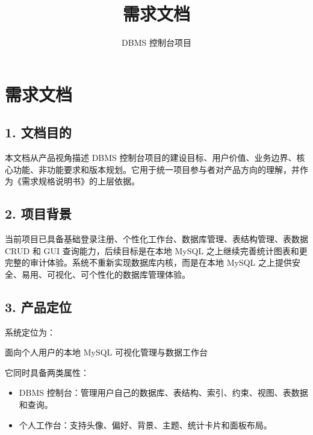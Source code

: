 \documentclass[
  a4paper,
  UTF8]{ctexart}
\title{需求文档}
\author{DBMS 控制台项目}
\date{}
\newenvironment{Shaded}{}{}
\newcommand{\NormalTok}[1]{#1}
\providecommand{\tightlist}{%
  \setlength{\itemsep}{0pt}\setlength{\parskip}{0pt}}
\begin{document}
\maketitle

\renewcommand*\contentsname{目录}
{
\hypersetup{linkcolor=}
\setcounter{tocdepth}{3}
\tableofcontents
}
\hypertarget{ux9700ux6c42ux6587ux6863}{%
\section{需求文档}\label{ux9700ux6c42ux6587ux6863}}

\hypertarget{ux6587ux6863ux76eeux7684}{%
\subsection{1. 文档目的}\label{ux6587ux6863ux76eeux7684}}

本文档从产品视角描述 DBMS
控制台项目的建设目标、用户价值、业务边界、核心功能、非功能要求和版本规划。它用于统一项目参与者对产品方向的理解，并作为《需求规格说明书》的上层依据。

\hypertarget{ux9879ux76eeux80ccux666f}{%
\subsection{2. 项目背景}\label{ux9879ux76eeux80ccux666f}}

当前项目已具备基础登录注册、个性化工作台、数据库管理、表结构管理、表数据
CRUD 和 GUI 查询能力，后续目标是在本地 MySQL
之上继续完善统计图表和更完整的审计体验。系统不重新实现数据库内核，而是在本地
MySQL 之上提供安全、易用、可视化、可个性化的数据库管理体验。

\hypertarget{ux4ea7ux54c1ux5b9aux4f4d}{%
\subsection{3. 产品定位}\label{ux4ea7ux54c1ux5b9aux4f4d}}

系统定位为：

\begin{Shaded}
\begin{Highlighting}[]
\NormalTok{面向个人用户的本地 MySQL 可视化管理与数据工作台}
\end{Highlighting}
\end{Shaded}

它同时具备两类属性：

\begin{itemize}
\tightlist
\item
  DBMS
  控制台：管理用户自己的数据库、表结构、索引、约束、视图、表数据和查询。
\item
  个人工作台：支持头像、偏好、背景、主题、统计卡片和面板布局。
\end{itemize}
\end{document}
